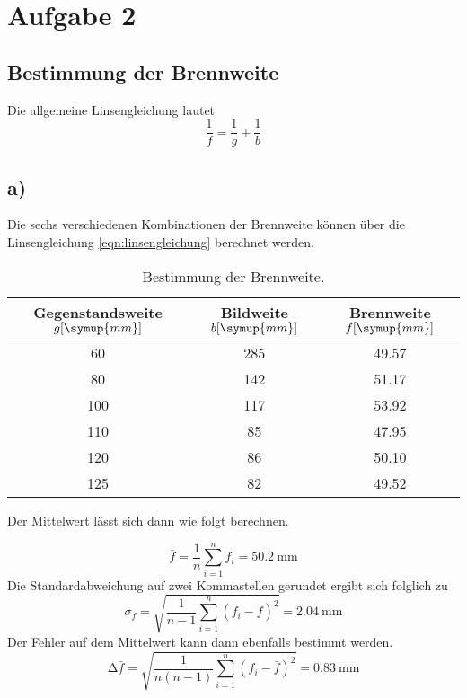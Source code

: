 \section{Aufgabe 2}
\subsection{Bestimmung der Brennweite}
Die allgemeine Linsengleichung lautet
\begin{equation}
\frac{1}{f} = \frac{1}{g} + \frac{1}{b}
\label{eqn:linsengleichung}
\end{equation}
\subsection{a)}
Die sechs verschiedenen Kombinationen der Brennweite können über die Linsengleichung \eqref{eqn:linsengleichung} berechnet werden.

\begin{table}
\centering
\caption{Bestimmung der Brennweite.}
\label{tab:lösunga}
\begin{tabular}{c c c}
    Gegenstandsweite $g [\symup{mm}]$ & Bildweite $b [\symup{mm}]$ & Brennweite $f [\symup{mm}]$\\
    \midrule
    60 &285 &49.57\\
    80 &142 &51.17\\
    100& 117&53.92\\
    110& 85 &47.95\\
    120& 86 &50.10\\
    125& 82 &49.52\\
    \bottomrule
\end{tabular}
\end{table}
\begin{flushleft}
Der Mittelwert lässt sich dann wie folgt berechnen.
\end{flushleft}
\begin{equation}
\bar{f} = \frac{1}{n} \sum_{i=1}^n f_i = \SI{50.2}{\milli\meter}
\label{eqn:mittelwert_f}
\end{equation}
Die Standardabweichung auf zwei Kommastellen gerundet ergibt sich folglich zu
\begin{equation}
\sigma_f = \sqrt{\frac{1}{n-1} \sum_{i=1}^n (f_i - \bar{f})^2} = \SI{2.04}{\milli\meter}
\label{eqn:sigma_f}
\end{equation}
Der Fehler auf dem Mittelwert kann dann ebenfalls bestimmt werden.
\begin{equation}
\increment \bar{f} = \sqrt{\frac{1}{n(n-1)} \sum_{i=1}^n (f_i - \bar{f})^2} = \SI{0.83}{\milli\meter}
\label{eqn:seoftm_f}
\end{equation}
